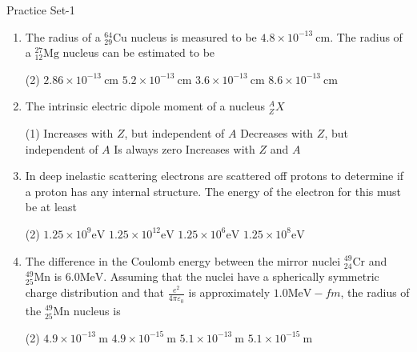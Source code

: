 \newpage
\begin{abox}
	Practice Set-1
\end{abox}
\begin{enumerate}
	\item  The radius of a ${ }_{29}^{64} \mathrm{Cu}$ nucleus is measured to be $4.8 \times 10^{-13} \mathrm{~cm}$. The radius of a ${ }_{12}^{27} \mathrm{Mg}$ nucleus can be estimated to be
	 \begin{tasks}(2)
		\task[\textbf{a.}]$2.86 \times 10^{-13} \mathrm{~cm}$
		\task[\textbf{b.}]$5.2 \times 10^{-13} \mathrm{~cm}$
		\task[\textbf{c.}] $3.6 \times 10^{-13} \mathrm{~cm}$
		\task[\textbf{d.}] $8.6 \times 10^{-13} \mathrm{~cm}$
	\end{tasks}
\item  The intrinsic electric dipole moment of a nucleus ${ }_Z^A X$
	 \begin{tasks}(1)
		\task[\textbf{a.}]Increases with $Z$, but independent of $A$
		\task[\textbf{b.}]Decreases with $Z$, but independent of $A$
		\task[\textbf{c.}]Is always zero
		\task[\textbf{d.}]Increases with $Z$ and $A$
	\end{tasks}
\item  In deep inelastic scattering electrons are scattered off protons to determine if a proton has any internal structure. The energy of the electron for this must be at least
	 \begin{tasks}(2)
		\task[\textbf{a.}]$1.25 \times 10^9 \mathrm{eV}$
		\task[\textbf{b.}]$1.25 \times 10^{12} \mathrm{eV}$
		\task[\textbf{c.}] $1.25 \times 10^6 \mathrm{eV}$
		\task[\textbf{d.}] $1.25 \times 10^8 \mathrm{eV}$
	\end{tasks}
\item  The difference in the Coulomb energy between the mirror nuclei ${ }_{24}^{49} \mathrm{Cr}$ and ${ }_{25}^{49} \mathrm{Mn}$ is $6.0 \mathrm{MeV}$. Assuming that the nuclei have a spherically symmetric charge distribution and that $\frac{e^2}{4 \pi \varepsilon_0}$ is approximately $1.0 \mathrm{MeV}-f m$, the radius of the ${ }_{25}^{49} \mathrm{Mn}$ nucleus is
	 \begin{tasks}(2)
		\task[\textbf{a.}]$4.9 \times 10^{-13} \mathrm{~m}$
		\task[\textbf{b.}]$4.9 \times 10^{-15} \mathrm{~m}$
		\task[\textbf{c.}]$5.1 \times 10^{-13} \mathrm{~m}$
		\task[\textbf{d.}] $5.1 \times 10^{-15} \mathrm{~m}$
	\end{tasks}
\end{enumerate}
\setlength\arrayrulewidth{1pt}
